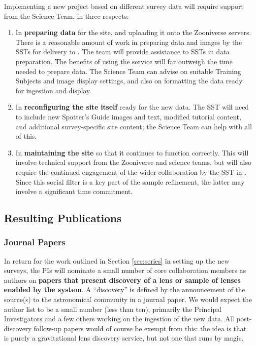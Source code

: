 \documentclass[a4paper]{article}
\begin{document}
Implementing a new project based on different survey data will require support from the \sw Science Team, in three respects: 

\begin{enumerate}

\item In {\bf preparing data} for the site, and uploading it onto the
Zooniverse servers. There is a reasonable amount of work in preparing data and images by the SSTs for delivery to \sw. The \sw team will provide assistance to SSTs in data preparation. The benefits of using the \sw service will far outweigh the time needed to prepare data.  The \sw Science Team can advise on suitable Training
Subjects and image display settings, and also on formatting the data
ready for ingestion and display.

\item In {\bf reconfiguring the site itself} ready for the new data. The
SST will need to include new Spotter's Guide images and text,
modified tutorial content, and additional survey-specific site content;
the \sw Science Team can help with all of this.

\item In {\bf maintaining the site} so that it continues to function
correctly. This will involve technical support from the Zooniverse and \sw science teams,
but will also require the continued engagement of the wider
collaboration by the SST in \Talk. Since this social filter is
a key part of the sample refinement, the latter may involve a
significant time commitment.

\end{enumerate}

\subsection{Resulting Publications}

\subsubsection{Journal Papers}

In return for the work outlined in Section \ref{sec:series} in setting up the new surveys, the \sw PIs will nominate a
small number of core \sw collaboration members as authors on \textbf{papers that
present discovery of a lens or sample of lenses enabled by the \sw system}. A ``discovery'' is defined by the announcement of the source(s) to the astronomical community in a journal paper. We would expect the \sw author list to be a small number (less than ten), primarily the Principal Investigators and a few others working on the ingestion of the new data. All post-discovery follow-up papers would of course be exempt from this: the idea is that \sw is purely a gravitational lens discovery service, but not one that runs by magic.
\end{document}
